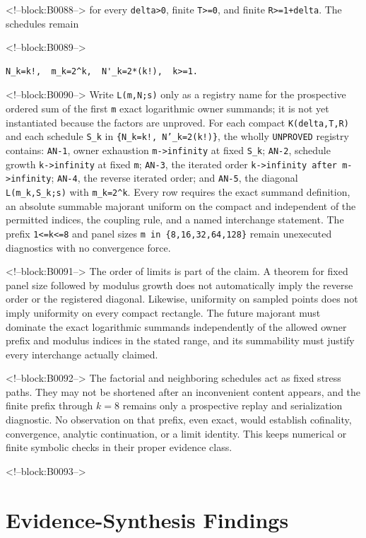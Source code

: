 \documentclass[11pt]{article}
\begin{document}
<!--block:B0088-->
for every \texttt{delta\textgreater{}0}, finite
\texttt{T\textgreater{}=0}, and finite \texttt{R\textgreater{}=1+delta}.
The schedules remain

<!--block:B0089-->
\begin{verbatim}
N_k=k!,  m_k=2^k,  N'_k=2*(k!),  k>=1.
\end{verbatim}

<!--block:B0090-->
Write \texttt{L(m,N;s)} only as a registry name for the prospective
ordered sum of the first \texttt{m} exact logarithmic owner summands; it is not
yet instantiated because the factors are unproved. For each compact
\texttt{K(delta,T,R)} and each schedule \texttt{S\_k} in
\texttt{\{N\_k=k!, N'\_k=2(k!)\}}, the wholly \texttt{UNPROVED} registry
contains: \texttt{AN-1}, owner exhaustion \texttt{m->infinity} at fixed
\texttt{S\_k}; \texttt{AN-2}, schedule growth \texttt{k->infinity} at fixed
\texttt{m}; \texttt{AN-3}, the iterated order
\texttt{k->infinity after m->infinity}; \texttt{AN-4}, the reverse iterated
order; and \texttt{AN-5}, the diagonal
\texttt{L(m\_k,S\_k;s)} with \texttt{m\_k=2^k}. Every row requires the
exact summand definition, an absolute summable majorant uniform on the compact
and independent of the permitted indices, the coupling rule, and a named
interchange statement. The prefix \texttt{1<=k<=8} and panel sizes
\texttt{m in \{8,16,32,64,128\}} remain unexecuted diagnostics with no
convergence force.

<!--block:B0091-->
The order of limits is part of the claim. A theorem for fixed panel size
followed by modulus growth does not automatically imply the reverse
order or the registered diagonal. Likewise, uniformity on sampled
points does not imply uniformity on every compact rectangle. The future
majorant must dominate the exact logarithmic summands independently of
the allowed owner prefix and modulus indices in the stated range, and
its summability must justify every interchange actually claimed.

<!--block:B0092-->
The factorial and neighboring schedules act as fixed stress paths. They
may not be shortened after an inconvenient content appears, and the
finite prefix through $k=8$ remains only a prospective replay and
serialization diagnostic. No observation on that prefix, even exact,
would establish cofinality, convergence, analytic continuation, or a
limit identity. This keeps numerical or finite symbolic checks in their
proper evidence class.

<!--block:B0093-->
\hypertarget{5-evidence-synthesis-findings}{%
\section{Evidence-Synthesis
Findings}\label{5-evidence-synthesis-findings}}
\end{document}
